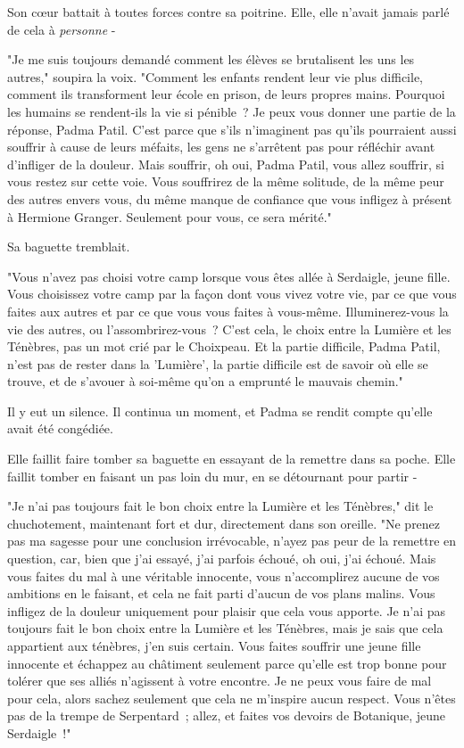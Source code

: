 Son cœur battait à toutes forces contre sa poitrine. Elle, elle n'avait jamais parlé de cela à \emph{personne} -

"Je me suis toujours demandé comment les élèves se brutalisent les uns les autres," soupira la voix. "Comment les enfants rendent leur vie plus difficile, comment ils transforment leur école en prison, de leurs propres mains. Pourquoi les humains se rendent-ils la vie si pénible~? Je peux vous donner une partie de la réponse, Padma Patil. C'est parce que s'ils n'imaginent pas qu'ils pourraient aussi souffrir à cause de leurs méfaits, les gens ne s'arrêtent pas pour réfléchir avant d'infliger de la douleur. Mais souffrir, oh oui, Padma Patil, vous allez souffrir, si vous restez sur cette voie. Vous souffrirez de la même solitude, de la même peur des autres envers vous, du même manque de confiance que vous infligez à présent à Hermione Granger. Seulement pour vous, ce sera mérité."

Sa baguette tremblait.

"Vous n'avez pas choisi votre camp lorsque vous êtes allée à Serdaigle, jeune fille. Vous choisissez votre camp par la façon dont vous vivez votre vie, par ce que vous faites aux autres et par ce que vous vous faites à vous-même. Illuminerez-vous la vie des autres, ou l'assombrirez-vous~? C'est cela, le choix entre la Lumière et les Ténèbres, pas un mot crié par le Choixpeau. Et la partie difficile, Padma Patil, n'est pas de rester dans la 'Lumière', la partie difficile est de savoir où elle se trouve, et de s'avouer à soi-même qu'on a emprunté le mauvais chemin."

Il y eut un silence. Il continua un moment, et Padma se rendit compte qu'elle avait été congédiée.

Elle faillit faire tomber sa baguette en essayant de la remettre dans sa poche. Elle faillit tomber en faisant un pas loin du mur, en se détournant pour partir -

"Je n'ai pas toujours fait le bon choix entre la Lumière et les Ténèbres," dit le chuchotement, maintenant fort et dur, directement dans son oreille. "Ne prenez pas ma sagesse pour une conclusion irrévocable, n'ayez pas peur de la remettre en question, car, bien que j'ai essayé, j'ai parfois échoué, oh oui, j'ai échoué. Mais vous faites du mal à une véritable innocente, vous n'accomplirez aucune de vos ambitions en le faisant, et cela ne fait parti d'aucun de vos plans malins. Vous infligez de la douleur uniquement pour plaisir que cela vous apporte. Je n'ai pas toujours fait le bon choix entre la Lumière et les Ténèbres, mais je sais que cela appartient aux ténèbres, j'en suis certain. Vous faites souffrir une jeune fille innocente et échappez au châtiment seulement parce qu'elle est trop bonne pour tolérer que ses alliés n'agissent à votre encontre. Je ne peux vous faire de mal pour cela, alors sachez seulement que cela ne m'inspire aucun respect. Vous n'êtes pas de la trempe de Serpentard~; allez, et faites vos devoirs de Botanique, jeune Serdaigle~!"


